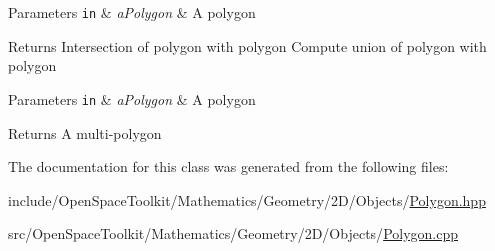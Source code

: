 \begin{DoxyParams}[1]{Parameters}
\mbox{\tt in}  & {\em a\+Polygon} & A polygon \\
\hline
\end{DoxyParams}
\begin{DoxyReturn}{Returns}
Intersection of polygon with polygon Compute union of polygon with polygon
\end{DoxyReturn}

\begin{DoxyParams}[1]{Parameters}
\mbox{\tt in}  & {\em a\+Polygon} & A polygon \\
\hline
\end{DoxyParams}
\begin{DoxyReturn}{Returns}
A multi-\/polygon 
\end{DoxyReturn}


The documentation for this class was generated from the following files\+:\begin{DoxyCompactItemize}
\item 
include/\+Open\+Space\+Toolkit/\+Mathematics/\+Geometry/2\+D/\+Objects/\hyperlink{2_d_2_objects_2_polygon_8hpp}{Polygon.\+hpp}\item 
src/\+Open\+Space\+Toolkit/\+Mathematics/\+Geometry/2\+D/\+Objects/\hyperlink{2_d_2_objects_2_polygon_8cpp}{Polygon.\+cpp}\end{DoxyCompactItemize}
